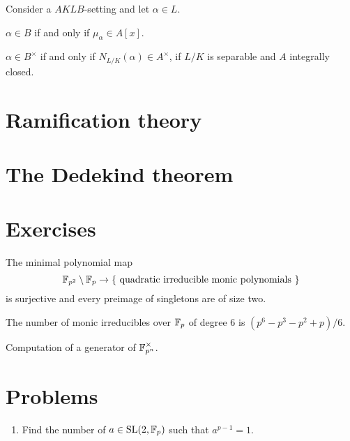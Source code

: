 \documentclass{../../large}
\begin{document}
\begin{prb}
\end{prb}




Consider a $AKLB$-setting and let $\alpha\in L$.
\begin{parts}
\item $\alpha\in B$ if and only if $\mu_\alpha\in A[x]$.
\item $\alpha\in B^\times$ if and only if $N_{L/K}(\alpha)\in A^\times$, if $L/K$ is separable and $A$ integrally closed.
\end{parts}
\section{Ramification theory}

\section{The Dedekind theorem}






\section*{Exercises}
\begin{prb}
The minimal polynomial map
\[\mathbb{F}_{p^2}\setminus\mathbb{F}_p\to\{\text{ quadratic irreducible monic polynomials }\}\]
is surjective and every preimage of singletons are of size two.
\begin{parts}
\item The number of monic irreducibles over $\mathbb{F}_p$ of degree 6 is $(p^6-p^3-p^2+p)/6$.
\end{parts}
\end{prb}

\begin{prb}
Computation of a generator of $\mathbb{F}_{p^n}^\times$.
\end{prb}

\begin{prb}
\end{prb}

\section*{Problems}

\begin{enumerate}
\item Find the number of $a\in\mathrm{SL}(2,\mathbb{F}_p)$ such that $a^{p-1}=1$.
\end{enumerate}
\end{document}

